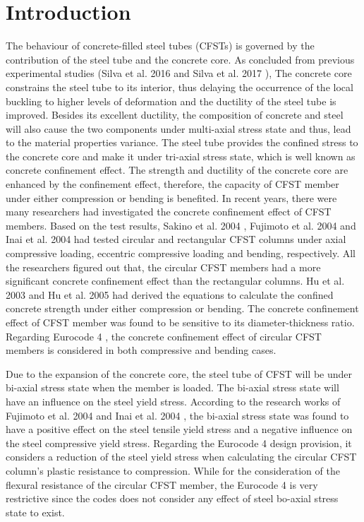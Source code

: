 \documentclass[12pt, A4]{article}
\begin{document}
	\section{Introduction}
	The behaviour of concrete-filled steel tubes (CFSTs) is governed by the contribution of the steel tube and the concrete core. As concluded from previous experimental studies (Silva et al. 2016 \cite{Silva2016} and Silva et al. 2017 \cite{RN140}), The concrete core constrains the steel tube to its interior, thus delaying the occurrence of the local buckling to higher levels of deformation and the ductility of the steel tube is improved. Besides its excellent ductility, the composition of concrete and steel will also cause the two components under multi-axial stress state and thus, lead to the material properties variance. The steel tube provides the confined stress to the concrete core and make it under tri-axial stress state, which is well known as concrete confinement effect. The strength and ductility of the concrete core are enhanced by the confinement effect, therefore, the capacity of CFST member under either compression or bending is benefited. In recent years, there were many researchers had investigated the concrete confinement effect of CFST members. Based on the test results, Sakino et al. 2004 \cite{RN41}, Fujimoto et al. 2004 \cite{RN15} and Inai et al. 2004 \cite{RN30} had tested circular and rectangular CFST columns under axial compressive loading, eccentric compressive loading and bending, respectively. All the researchers figured out that, the circular CFST members had a more significant concrete confinement effect than the rectangular columns. Hu et al. 2003 \cite{RN1} and Hu et al. 2005 \cite{RN29} had derived the equations to calculate the confined concrete strength under either compression or bending. The concrete confinement effect of CFST member was found to be sensitive to its diameter-thickness ratio. Regarding Eurocode 4 \cite{RN64}, the concrete confinement effect of circular CFST members is considered in both compressive and bending cases.
	\par
	Due to the expansion of the concrete core, the steel tube of CFST will be under bi-axial stress state when the member is loaded. The bi-axial stress state will have an influence on the steel yield stress. According to the research works of Fujimoto et al. 2004 \cite{RN15} and Inai et al. 2004 \cite{RN30}, the bi-axial stress state was found to have a positive effect on the steel tensile yield stress and a negative influence on the steel  compressive yield stress. Regarding the Eurocode 4 \cite{RN64} design provision, it considers a reduction of the steel yield stress when calculating the circular CFST column's plastic resistance to compression. While for the consideration of the flexural resistance of the circular CFST member, the Eurocode 4 is very restrictive since the codes does not consider any effect of steel bo-axial stress state to exist.
\end{document}
